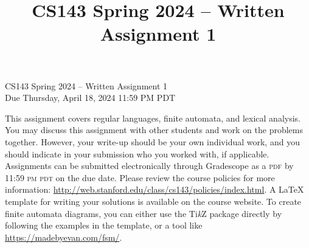 \documentclass[11pt]{article}
\title{CS143 Spring 2024 -- Written Assignment 1}
\newcommand{\tikzname}{Ti\emph{k}Z}
\begin{document}
\begin{center}
{\LARGE{CS143 Spring 2024 -- Written Assignment 1}} \\
{\large Due Thursday, April 18, 2024 11:59 PM PDT}
\end{center}

This assignment covers regular languages, finite automata, and lexical analysis. You may discuss this assignment with other students and work on the problems together. However, your write-up should be your own individual work, and you should indicate in your submission who you worked with, if applicable. Assignments can be submitted electronically through Gradescope as a \textsc{pdf} by 11:59 \textsc{pm pdt} on the due date. Please review the course policies for more information: \url{http://web.stanford.edu/class/cs143/policies/index.html}. A \LaTeX{} template for writing your solutions is available on the course website. To create finite automata diagrams, you can either use the \tikzname{} package directly by following the examples in the template, or a tool like \url{https://madebyevan.com/fsm/}.
\end{document}
